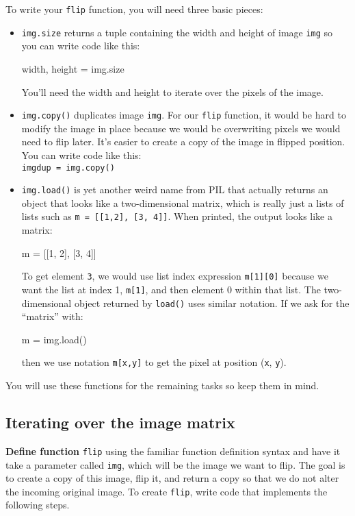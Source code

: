 \documentclass[titlepage]{tufte-book}
\begin{document}
To write your {\tt flip} function, you will need three basic pieces:

\begin{itemize}
\item {\tt img.size} returns a tuple containing the width and height of image {\tt img} so you can write code like this:
\begin{pyverbatim}
width, height = img.size
\end{pyverbatim}
You'll need the width and height to iterate over the pixels of the image.

\item {\tt img.copy()} duplicates image {\tt img}.  For our {\tt flip} function, it would be hard to modify the image in place because we would be overwriting pixels we would need to flip later. It's easier to create a copy of the image in flipped position. You can write code like this:\\
{\tt imgdup = img.copy()}

\item {\tt img.load()} is yet another weird name from PIL that actually returns an object that looks like a two-dimensional matrix, which is really just a lists of lists such as {\tt m = [[1,2], [3, 4]]}. When printed, the output looks like a matrix:

\begin{pyverbatim}
m = [[1, 2],
     [3, 4]]
\end{pyverbatim}
To get element {\tt 3}, we would use list index expression {\tt m[1][0]} because we want the list at index 1, {\tt m[1]}, and then element 0 within that list. The two-dimensional object returned by {\tt load()} uses similar notation. If we ask for the ``matrix'' with:
\begin{pyverbatim}
m = img.load()
\end{pyverbatim}
then we  use notation {\tt m[x,y]} to get the pixel at position ({\tt x}, {\tt y}).
\end{itemize}

You will use these functions for the remaining tasks so keep them in mind.

\subsection{Iterating over the image matrix}

{\bf Define function} {\tt flip} using the familiar function definition syntax and have it take a parameter called {\tt img}, which will be the image we want to flip. The goal is to create a copy of this image, flip it, and return a copy so that we do not alter the incoming original image. To create {\tt flip}, write code that implements the following steps.
\end{document}
